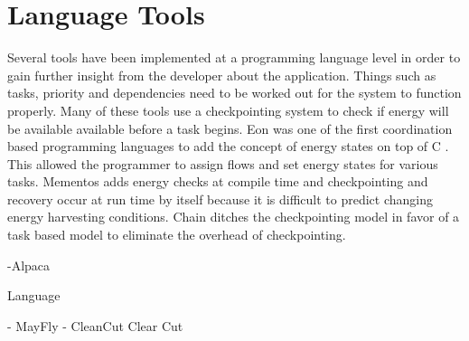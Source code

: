 \section{Language Tools} %
\label{sec:language_tools}

Several tools have been implemented at a programming language level in order to gain further insight from the developer about the application.
Things such as tasks, priority and dependencies need to be worked out for the system to function properly.
Many of these tools use a checkpointing system to check if energy will be available available before a task begins.
Eon was one of the first coordination based programming languages to add the concept of energy states on top of C \cite{eon}.
This allowed the programmer to assign flows and set energy states for various tasks.
Mementos \cite{mementos} adds energy checks at compile time and checkpointing and recovery occur at run time by itself because it is difficult to predict changing energy harvesting conditions.
Chain \cite{chain} ditches the checkpointing model in favor of a task based model to eliminate the overhead of checkpointing.



-Alpaca \cite{alpaca}


Language

- MayFly \cite{mayfly}
- CleanCut   Clear Cut \cite{cleancut}
